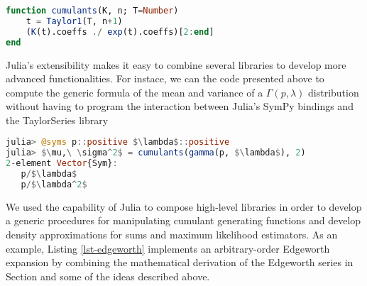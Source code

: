 \begin{lstlisting}[language=Julia, mathescape, escapechar=\%]
function cumulants(K, n; T=Number)
    t = Taylor1(T, n+1)
    (K(t).coeffs ./ exp(t).coeffs)[2:end]
end
\end{lstlisting}
Julia's extensibility makes it easy to combine several libraries to develop more advanced functionalities. For instace, we can the code presented above to compute the generic formula of the mean and variance of a $\Gamma(p, \lambda)$ distribution without having to program the interaction between Julia's SymPy bindings and the TaylorSeries library
\begin{lstlisting}[language=Julia, mathescape, escapechar=\%]
julia> @syms p::positive $\lambda$::positive
julia> $\mu,\ \sigma^2$ = cumulants(gamma(p, $\lambda$), 2)
2-element Vector{Sym}:
   p/$\lambda$
   p/$\lambda^2$
\end{lstlisting}
We used the capability of Julia to compose high-level libraries in order to develop a generic procedures for manipulating cumulant generating functions and develop density approximations for sums and maximum likelihood estimators. As an example, Listing \ref{lst-edgeworth} implements an arbitrary-order Edgeworth expansion by combining the mathematical derivation of the Edgeworth series in Section  and some of the ideas described above.

